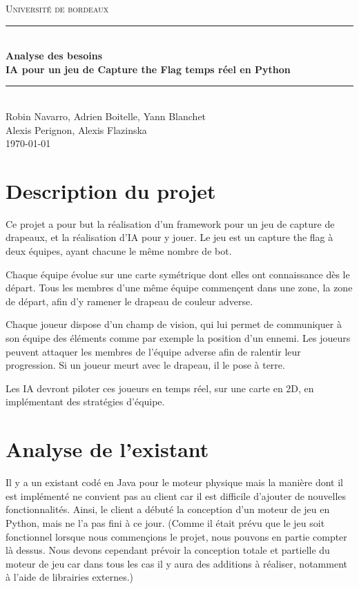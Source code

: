 \documentclass[french]{article}
\begin{document}
\begin{titlepage}
\newcommand{\HRule}{\rule{\linewidth}{0.5mm}}
\center
\textsc{\LARGE
Université de bordeaux
} \\[1cm]

\HRule \\[0.2cm]
{ \huge \bfseries Analyse des besoins \\[0.15cm] }
{ \bfseries IA pour un jeu de Capture the Flag temps réel en Python\\[0.15cm] }
\HRule \\[1.5cm]
Robin Navarro, Adrien Boitelle, Yann Blanchet\\Alexis Perignon, Alexis Flazinska
\\[1cm]
\today \\ [1cm]
\end{titlepage}

\newpage
\Large
\tableofcontents


\normalsize
\newpage
\section{Description du projet}

Ce projet a pour but la réalisation d'un framework pour un jeu de capture de drapeaux, et la réalisation d'IA pour y jouer.
Le jeu est un capture the flag à deux équipes, ayant chacune le même nombre de bot.
\newline

Chaque équipe évolue sur une carte symétrique dont elles ont connaissance dès le départ. Tous les membres d'une même équipe commençent dans une zone, la zone de départ, afin d'y ramener le drapeau de couleur adverse.
\newline

Chaque joueur dispose d'un champ de vision, qui lui permet de communiquer à son équipe des éléments comme par exemple la position d'un ennemi. Les joueurs peuvent attaquer les membres de l'équipe adverse afin de ralentir leur progression. Si un joueur meurt avec le drapeau, il le pose à terre.
\newline

Les IA devront piloter ces joueurs en temps réel, sur une carte en 2D, en implémentant des stratégies d'équipe.


\section{Analyse de l'existant}
    
Il y a un existant codé en Java pour le moteur physique mais la manière dont il est implémenté ne convient pas au client car il est difficile d'ajouter de nouvelles fonctionnalités. Ainsi, le client a débuté la conception d'un moteur de jeu en Python, mais ne l'a pas fini à ce jour. \newline
(Comme il était prévu que le jeu soit fonctionnel lorsque nous commençions le projet, nous pouvons en partie compter là dessus. Nous devons cependant prévoir la conception totale et partielle du moteur de jeu car dans tous les cas il y aura des additions à réaliser, notamment à l'aide de librairies externes.)
\end{document}
